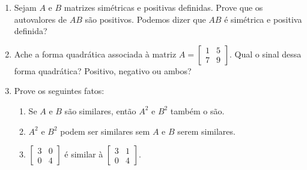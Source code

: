 \documentclass[leqno]{article}
\numberwithin{equation}{section}
\begin{document}
\begin{enumerate}

\item Sejam $A$ e $B$ matrizes simétricas e positivas definidas. Prove que os autovalores de $AB$ são positivos. Podemos dizer que $AB$ é simétrica e positiva definida?

\begin{sol} 
\end{sol} 


\item Ache a forma quadrática associada à matriz $A = \begin{bmatrix}
1 & 5 \\
7 & 9
\end{bmatrix}$. Qual o sinal dessa forma quadrática? Positivo, negativo ou ambos?

\begin{sol} 
\end{sol} 


\item Prove os seguintes fatos:

\begin{enumerate}

\item Se $A$ e $B$ são similares, então $A^2$ e $B^2$ também o são.

\begin{sol} 
\end{sol} 

\item $A^2$ e $B^2$ podem ser similares sem $A$ e $B$ serem similares.

\begin{sol} 
\end{sol} 

\item $\begin{bmatrix}
3 & 0 \\
0 & 4
\end{bmatrix}$ é similar à $\begin{bmatrix}
3 & 1 \\
0 & 4
\end{bmatrix}$.


\end{enumerate}
\end{enumerate}
\end{document}
